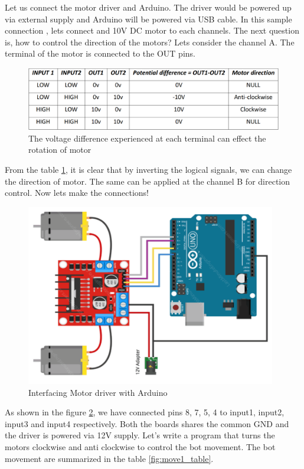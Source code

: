 \par Let us connect the motor driver and Arduino. The driver would be powered up via external supply and Arduino will be powered via USB cable. In this sample connection , lets connect and 10V DC motor to each channels. The next question is, how to control the direction of the motors? Lets consider the channel A. The terminal of the motor is connected to the OUT pins.
\begin{figure}
    \centering
    \includegraphics{Tables/Motor_Driver/wheel_dir.png}
    \caption[Wheel potential difference]{The voltage difference experienced at each terminal can effect the rotation of motor}
    \label{fig:wheel_potential}
\end{figure}
\par From the table \ref{fig:wheel_potential}, it is clear that by inverting the logical signals, we can change the direction of motor. The same can be applied at the channel B for direction control. Now lets make the connections!

\begin{figure}
    \centering
    \includegraphics[width=4.3in]{Images/Motor_Driver/connection1.png}
    \caption{Interfacing Motor driver with Arduino}
    \label{fig:motor_connection}
\end{figure}

As shown in the figure \ref{fig:motor_connection}, we have connected pins 8, 7, 5, 4 to input1, input2, input3 and input4 respectively. Both the boards shares the common GND and the driver is powered via 12V supply. Let’s write a program that turns the motors clockwise and anti clockwise to control the bot movement. The bot movement are summarized in the table \ref{fig:move1_table}.

